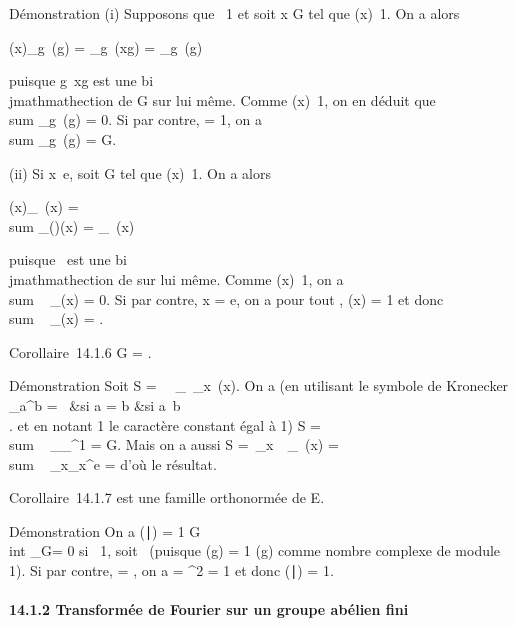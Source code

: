 \documentclass[]{article}
\begin{document}
Démonstration (i) Supposons que \chi\neq~1 et soit x
\in G tel que \chi(x)\neq~1. On a alors

\chi(x)\sum _g\inG~\chi(g) =
\sum _g\inG~\chi(xg) =
\sum _g\inG~\chi(g)

puisque g\mapsto~xg est une bi\\jmathmathection de G sur lui
même. Comme \chi(x)\neq~1, on en déduit que
\\sum  _g\inG~\chi(g)
= 0. Si par contre, \chi = 1, on a
\\sum  _g\inG~\chi(g)
= G.

(ii) Si x\neq~e, soit \phi \in\hat
G tel que \phi(x)\neq~1. On a alors

\phi(x)\sum _\chi\in\hatG~\chi(x)
= \\sum
_\chi\in\hatG(\phi\chi)(x) =
\sum _\chi\in\hatG~\chi(x)

puisque \chi\mapsto~\phi\chi est une bi\\jmathmathection de
\hatG sur lui même. Comme
\phi(x)\neq~1, on a
\\sum ~
_\chi\in\hatG\chi(x) = 0. Si par contre, x = e, on a
pour tout \chi, \chi(x) = 1 et donc
\\sum ~
_\chi\in\hatG\chi(x) =
\hatG.

Corollaire~14.1.6 G =
\hatG.

Démonstration Soit S =\
\sum ~
_\chi\in\hatG\
\sum  _x\inG~\chi(x). On a (en utilisant le
symbole de Kronecker \delta_a^b = \left
\ \cases 1&si a = b
&si a\neq~b\\ 
\right . et en notant 1 le caractère constant égal à 1) S
= \\sum ~
_\chi\in\hatGG\delta_\chi^1
= G. Mais on a aussi S =\
\sum  _x\inG~\
\sum  _\chi\in\hatG~\chi(x)
= \\sum ~
_x\inG\hatG\delta_x^e
= \hatG d'où le résultat.

Corollaire~14.1.7 \hatG est une famille orthonormée
de E.

Démonstration On a (\chi∣\phi) = 1
\over G \\int
 _G\overline\chi\phi = 0 si
\overline\chi\phi\neq~1, soit
\chi\neq~\phi (puisque \overline\chi(g)
= 1 \over \chi(g) comme nombre complexe de module 1). Si
par contre, \chi = \phi, on a \overline\chi\phi =
\chi^2 = 1 et donc
(\chi∣\phi) = 1.

\paragraph{14.1.2 Transformée de Fourier sur un groupe abélien fini}
\end{document}
